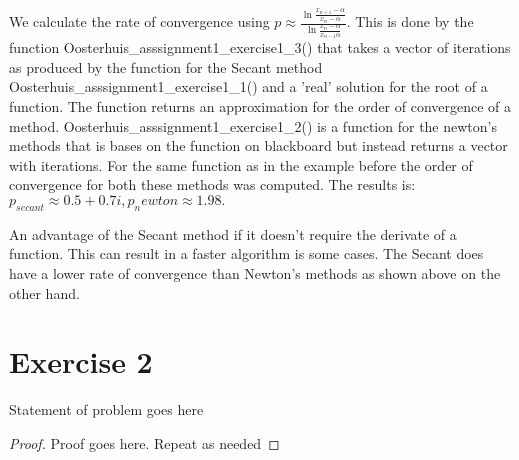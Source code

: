 \documentclass[10pt]{article}
\newenvironment{problem}[2][Problem]{\begin{trivlist}
\item[\hskip \labelsep {\bfseries #1}\hskip \labelsep {\bfseries #2.}]}{\end{trivlist}}
\begin{document}
We calculate the rate of convergence using $p \approx \frac{\ln{\frac{x_{n+1}-\alpha}{x_n-\alpha}}}{\ln{\frac{x_{n}-\alpha}{x_{n-1}\alpha}}}$. This is done by the function Oosterhuis\_asssignment1\_exercise1\_3() that takes a vector of iterations as produced by the function for the Secant method Oosterhuis\_asssignment1\_exercise1\_1() and a 'real' solution for the root of a function. The function returns an approximation for the order of convergence of a method. Oosterhuis\_asssignment1\_exercise1\_2() is a function for the newton's methods that is bases on the function on blackboard but instead returns a vector with iterations. For the same function as in the example before the order of convergence for both these methods was computed. The results is: $p_{secant}\approx 0.5 + 0.7i, p_newton \approx 1.98.$

%
%
An advantage of the Secant method if it doesn't require the derivate of a function. This can result in a faster algorithm is some cases. The Secant does have a lower rate of convergence than Newton's methods as shown above on the other hand.

\section{Exercise 2}


\begin{problem}{x.yz}
Statement of problem goes here
\end{problem}
 
\begin{proof}
Proof goes here. Repeat as needed
\end{proof}
\end{document}
